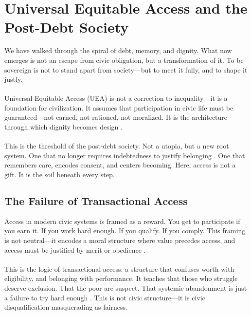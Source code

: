 \documentclass[12pt]{article}
\begin{document}
\section{Universal Equitable Access and the Post-Debt Society}

We have walked through the spiral of debt, memory, and dignity. What now emerges is not an escape from civic obligation, but a transformation of it. To be sovereign is not to stand apart from society—but to meet it fully, and to shape it justly.

\paragraph{}Universal Equitable Access (UEA) is not a correction to inequality—it is a foundation for civilization. It assumes that participation in civic life must be guaranteed—not earned, not rationed, not moralized. It is the architecture through which dignity becomes design \cite{brown2022architecture}.

\paragraph{}This is the threshold of the post-debt society. Not a utopia, but a new root system. One that no longer requires indebtedness to justify belonging \cite{graeber2011debt}. One that remembers care, encodes consent, and centers becoming. Here, access is not a gift. It is the soil beneath every step.

\subsection{The Failure of Transactional Access}

Access in modern civic systems is framed as a reward. You get to participate if you earn it. If you work hard enough. If you qualify. If you comply. This framing is not neutral—it encodes a moral structure where value precedes access, and access must be justified by merit or obedience \cite{fraser2003justice}.

\paragraph{}This is the logic of transactional access: a structure that confuses worth with eligibility, and belonging with performance. It teaches that those who struggle deserve exclusion. That the poor are suspect. That systemic abandonment is just a failure to try hard enough \cite{piven1993regulating}. This is not civic structure—it is civic disqualification masquerading as fairness.
\end{document}
